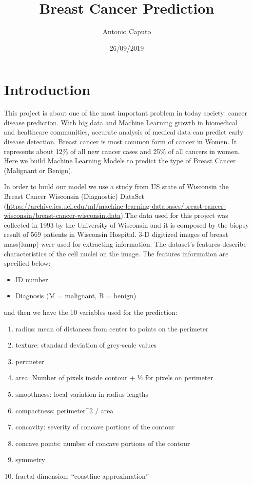 \documentclass[]{article}
\title{Breast Cancer Prediction}
\author{Antonio Caputo}
\date{26/09/2019}
\providecommand{\tightlist}{%
  \setlength{\itemsep}{0pt}\setlength{\parskip}{0pt}}
\begin{document}
\maketitle

\hypertarget{introduction}{%
\section{Introduction}\label{introduction}}

This project is about one of the most important problem in today
society: cancer disease prediction. With big data and Machine Learning
growth in biomedical and healthcare communities, accurate analysis of
medical data can predict early disease detection. Breast cancer is most
common form of cancer in Women. It represents about 12\% of all new
cancer cases and 25\% of all cancers in women. Here we build Machine
Learning Models to predict the type of Breast Cancer (Malignant or
Benign).

In order to build our model we use a study from US state of Wisconsin
the Breast Cancer Wisconsin (Diagnostic) DataSet
(\url{https://archive.ics.uci.edu/ml/machine-learning-databases/breast-cancer-wisconsin/breast-cancer-wisconsin.data}).The
data used for this project was collected in 1993 by the University of
Wisconsin and it is composed by the biopsy result of 569 patients in
Wisconsin Hospital. 3-D digitized images of breast mass(lump) were used
for extracting information. The dataset's features describe
characteristics of the cell nuclei on the image. The features
information are specified below:

\begin{itemize}
\tightlist
\item
  ID number
\item
  Diagnosis (M = malignant, B = benign)
\end{itemize}

and then we have the 10 variables used for the prediction:

\begin{enumerate}
\def\labelenumi{\arabic{enumi}.}
\tightlist
\item
  radius: mean of distances from center to points on the perimeter
\item
  texture: standard deviation of grey-scale values
\item
  perimeter
\item
  area: Number of pixels inside contour + ½ for pixels on perimeter
\item
  smoothness: local variation in radius lengths
\item
  compactness: perimeter\^{}2 / area\\
\item
  concavity: severity of concave portions of the contour
\item
  concave points: number of concave portions of the contour
\item
  symmetry
\item
  fractal dimension: ``coastline approximation''
\end{enumerate}
\end{document}
